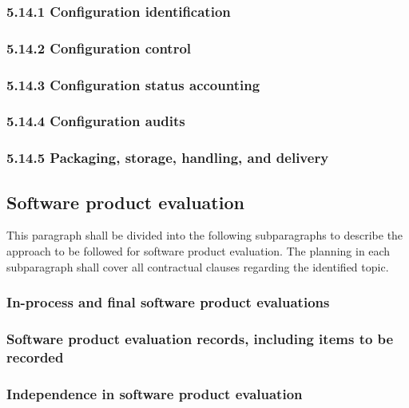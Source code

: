 \documentclass{fidata-report-template}
\begin{document}
\subsubsection{5.14.1 Configuration identification}

\subsubsection{5.14.2 Configuration control}

\subsubsection{5.14.3 Configuration status accounting}

\subsubsection{5.14.4 Configuration audits}

\subsubsection{5.14.5 Packaging, storage, handling, and delivery}

\subsection{Software product evaluation}

This paragraph shall be divided into the following subparagraphs to
describe the approach to be followed for software product evaluation.
The planning in each subparagraph shall cover all contractual clauses
regarding the identified topic.

\subsubsection{In-process and final software product evaluations}

\subsubsection{Software product evaluation records, including items to
be recorded}

\subsubsection{Independence in software product evaluation}
\end{document}
